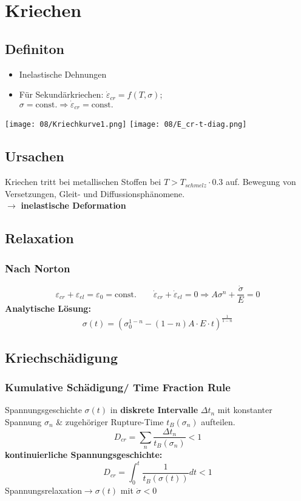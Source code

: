 \section{Kriechen}
    \subsection{Definiton}
        \begin{itemize}
            \item Inelastische Dehnungen
            \item Für Sekundärkriechen: $\dot{\varepsilon}_{cr} = f(T,\sigma)$;\\$\sigma = \textrm{const.} \Rightarrow \dot{\varepsilon}_{cr}= \textrm{const.}$
        \end{itemize}
        \vspace{-4mm}
        \texttt{[image: 08/Kriechkurve1.png]}
        \texttt{[image: 08/E\_cr-t-diag.png]}
    \subsection{Ursachen}
        Kriechen tritt bei metallischen Stoffen bei $ T > T_{schmelz} \cdot 0.3  $ auf.
        Bewegung von Versetzungen, Gleit- und Diffussionsphänomene. 
        \\$\rightarrow$ \textbf{inelastische Deformation}
        \vspace{2mm}
    \subsection{Relaxation}
        \subsubsection{Nach Norton}
            \[\varepsilon_{cr}+\varepsilon_{el}=\varepsilon_0=\textrm{const.} \qquad \boxed{\dot{\varepsilon}_{cr}+\dot{\varepsilon}_{el}=0 \Rightarrow A\sigma^n + \frac{\dot{\sigma}}{E}=0}\]
            \textbf{Analytische Lösung:}
            \vspace{-1mm}\[\boxed{\sigma(t)=\left(\sigma_{0}^{1-n}-(1-n)A\cdot E\cdot t\right)^{\frac{1}{1-n}}}\]
            
    \subsection{Kriechschädigung}
        \subsubsection{Kumulative Schädigung/ Time Fraction Rule}
            Spannungsgeschichte $\sigma(t)$ in \textbf{diskrete Intervalle} $\Delta t_n$ mit konstanter Spannung $\sigma_n$ \& zugehöriger Rupture-Time $t_B(\sigma_n)$ aufteilen.
            \[D_{cr}=\sum_n\frac{\Delta t_{n}}{t_B(\sigma_n)} < 1\]
            \textbf{kontinuierliche Spannungsgeschichte:}
            \[\boxed{D_{cr}=\int_0^t\frac{1}{t_B(\sigma(t))}dt < 1}\]
            Spannungsrelaxation$\rightarrow \sigma(t)$ mit $\dot{\sigma}<0$
            
